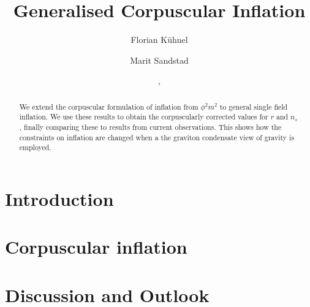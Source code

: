 \documentclass[aps, prd, preprint, superscriptaddress, tightenlines, nofootinbib]{revtex4}
\begin{document}
\title{\bf Generalised Corpuscular Inflation}

\author{Florian K{\"u}hnel}

\author{Marit Sandstad}

\date{\formatdate{\day}{\month}{\year}, \currenttime}

\begin{abstract}
We extend the corpuscular formulation of inflation from $\phi^2m^2$ to general single field inflation. 
We use these results to obtain the corpuscularly corrected values for $r$ and $n_s$, finally comparing
these to results from current observations. This shows how the constraints on inflation are changed 
when a the graviton condensate view of gravity is employed.
\end{abstract}

\maketitle


\section{Introduction}
\label{sec:Introduction}
\setcounter{equation}{0}

\noindent




\section{Corpuscular inflation}
\label{sec:Main-Part}
\setcounter{equation}{0}

\noindent




\section{Discussion and Outlook}
\label{sec:Discussion-and-Outlook}
\setcounter{equation}{0}
\end{document}
